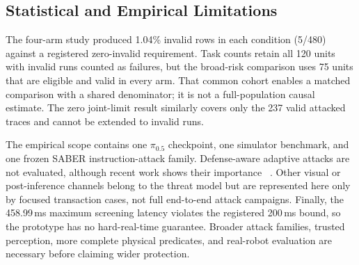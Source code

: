 \subsection{Statistical and Empirical Limitations}

The four-arm study produced 1.04\% invalid rows in each condition (5/480)
against a registered zero-invalid requirement.  Task counts retain all 120 units with
invalid runs counted as failures, but the broad-risk comparison uses 75 units
that are eligible and valid in every arm.  That common cohort enables a matched
comparison with a shared denominator; it is not a full-population causal
estimate.  The zero joint-limit result similarly covers only the 237 valid
attacked \ltwoenabled traces and cannot be extended to invalid runs.

The empirical scope contains one $\pi_{0.5}$ checkpoint, one simulator
benchmark, and one frozen SABER instruction-attack family.  Defense-aware
adaptive attacks are not evaluated, although recent work shows their importance
~\cite{adaptivesecond2026}.  Other visual or post-inference channels belong to
the threat model but are represented here only by focused transaction cases, not
full end-to-end attack campaigns.  Finally, the 458.99\,ms maximum screening
latency violates the registered 200\,ms bound, so the prototype has no
hard-real-time guarantee.  Broader attack families, trusted perception, more
complete physical predicates, and real-robot evaluation are necessary before
claiming wider protection.
